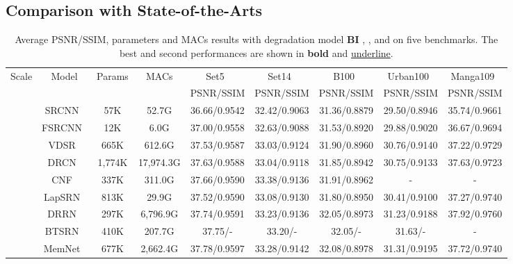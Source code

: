 \documentclass[manuscript,screen]{acmart}
\begin{document}
\subsection{Comparison with State-of-the-Arts}
\begin{table*}[t]
	\centering
	\caption{Average PSNR/SSIM, parameters and MACs results with degradation model \textbf{BI} , , and  on five benchmarks. The best and second performances are shown in \textbf{bold} and \underline{underline}.}
	\label{tab:BI-result}
	\fontsize{7.5}{8}\selectfont
	\begin{tabular}{|c|c|c|c|c|c|c|c|c|}
		\hline
		\multirow{2}{*}{Scale}& \multirow{2}{*}{Model}&  \multirow{2}{*}{Params}& \multirow{2}{*}{MACs}& Set5~\cite{set5}& Set14~\cite{set14}& B100~\cite{b100}& Urban100~\cite{urban100}& Manga109~\cite{manga109} \\
		& & & & PSNR/SSIM & PSNR/SSIM & PSNR/SSIM & PSNR/SSIM & PSNR/SSIM\\
\hline
		\hline
		\multirow{17}{*}{} &SRCNN~\cite{srcnn_pami2016}&57K &52.7G & 
		36.66/0.9542& 32.42/0.9063& 31.36/0.8879& 29.50/0.8946& 35.74/0.9661\\
		
		& FSRCNN~\cite{fsrcnn_eccv2016}&12K&6.0G& 
		37.00/0.9558& 32.63/0.9088& 31.53/0.8920& 29.88/0.9020& 36.67/0.9694\\
		
		& VDSR~\cite{vdsr_cvpr2016}&665K&612.6G& 
		37.53/0.9587& 33.03/0.9124& 31.90/0.8960& 30.76/0.9140& 37.22/0.9729\\
		
		& DRCN~\cite{drcn_cvpr2016}&1,774K&17,974.3G& 
		37.63/0.9588& 33.04/0.9118& 31.85/0.8942& 30.75/0.9133& 37.63/0.9723\\
		
		& CNF~\cite{cnf_cvprw2017}&337K&311.0G& 
		37.66/0.9590& 33.38/0.9136& 31.91/0.8962& - & - \\
		
		&LapSRN~\cite{lapsrn_cvpr2017}&813K&29.9G& 
		37.52/0.9590& 33.08/0.9130& 31.80/0.8950& 30.41/0.9100& 37.27/0.9740\\
		
		&DRRN~\cite{drrn_cvpr2017}&297K&6,796.9G& 
		37.74/0.9591& 33.23/0.9136& 32.05/0.8973& 31.23/0.9188& 37.92/0.9760\\
		
		&BTSRN~\cite{btsrn_cvprw2017}&410K&207.7G& 
		37.75/-& 33.20/-& 32.05/-& 31.63/-& -\\
		
		&MemNet~\cite{memnet_iccv2017}&677K&2,662.4G& 
		37.78/0.9597& 33.28/0.9142& 32.08/0.8978& 31.31/0.9195& 37.72/0.9740 \\
		

\end{tabular}
\end{table*}
\end{document}
